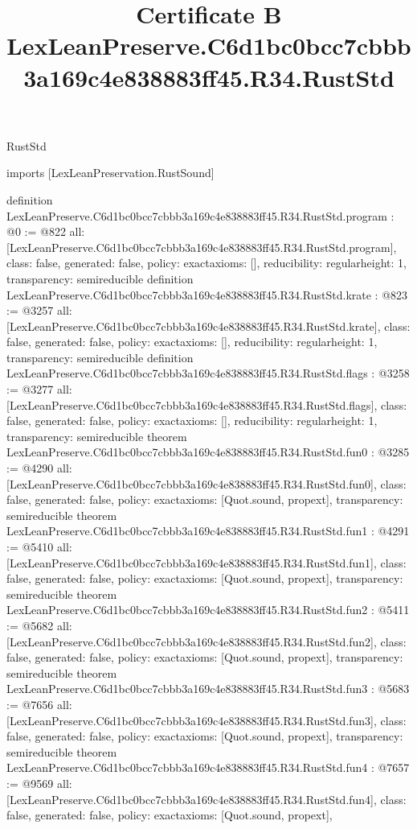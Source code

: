 \begin{lexlean}{RustStd}
\title{Certificate B LexLeanPreserve.C6d1bc0bcc7cbbb3a169c4e838883ff45.R34.RustStd}
\begin{coremodule}
imports [LexLeanPreservation.RustSound]

definition LexLeanPreserve.C6d1bc0bcc7cbbb3a169c4e838883ff45.R34.RustStd.program : @0 := @822 {
  all: [LexLeanPreserve.C6d1bc0bcc7cbbb3a169c4e838883ff45.R34.RustStd.program],
  class: false,
  generated: false,
  policy: exact{axioms: []},
  reducibility: regular{height: 1},
  transparency: semireducible
}
definition LexLeanPreserve.C6d1bc0bcc7cbbb3a169c4e838883ff45.R34.RustStd.krate : @823 := @3257 {
  all: [LexLeanPreserve.C6d1bc0bcc7cbbb3a169c4e838883ff45.R34.RustStd.krate],
  class: false,
  generated: false,
  policy: exact{axioms: []},
  reducibility: regular{height: 1},
  transparency: semireducible
}
definition LexLeanPreserve.C6d1bc0bcc7cbbb3a169c4e838883ff45.R34.RustStd.flags : @3258 := @3277 {
  all: [LexLeanPreserve.C6d1bc0bcc7cbbb3a169c4e838883ff45.R34.RustStd.flags],
  class: false,
  generated: false,
  policy: exact{axioms: []},
  reducibility: regular{height: 1},
  transparency: semireducible
}
theorem LexLeanPreserve.C6d1bc0bcc7cbbb3a169c4e838883ff45.R34.RustStd.fun0 : @3285 := @4290 {
  all: [LexLeanPreserve.C6d1bc0bcc7cbbb3a169c4e838883ff45.R34.RustStd.fun0],
  class: false,
  generated: false,
  policy: exact{axioms: [Quot.sound, propext]},
  transparency: semireducible
}
theorem LexLeanPreserve.C6d1bc0bcc7cbbb3a169c4e838883ff45.R34.RustStd.fun1 : @4291 := @5410 {
  all: [LexLeanPreserve.C6d1bc0bcc7cbbb3a169c4e838883ff45.R34.RustStd.fun1],
  class: false,
  generated: false,
  policy: exact{axioms: [Quot.sound, propext]},
  transparency: semireducible
}
theorem LexLeanPreserve.C6d1bc0bcc7cbbb3a169c4e838883ff45.R34.RustStd.fun2 : @5411 := @5682 {
  all: [LexLeanPreserve.C6d1bc0bcc7cbbb3a169c4e838883ff45.R34.RustStd.fun2],
  class: false,
  generated: false,
  policy: exact{axioms: [Quot.sound, propext]},
  transparency: semireducible
}
theorem LexLeanPreserve.C6d1bc0bcc7cbbb3a169c4e838883ff45.R34.RustStd.fun3 : @5683 := @7656 {
  all: [LexLeanPreserve.C6d1bc0bcc7cbbb3a169c4e838883ff45.R34.RustStd.fun3],
  class: false,
  generated: false,
  policy: exact{axioms: [Quot.sound, propext]},
  transparency: semireducible
}
theorem LexLeanPreserve.C6d1bc0bcc7cbbb3a169c4e838883ff45.R34.RustStd.fun4 : @7657 := @9569 {
  all: [LexLeanPreserve.C6d1bc0bcc7cbbb3a169c4e838883ff45.R34.RustStd.fun4],
  class: false,
  generated: false,
  policy: exact{axioms: [Quot.sound, propext]},
}
\end{coremodule}
\end{lexlean}
